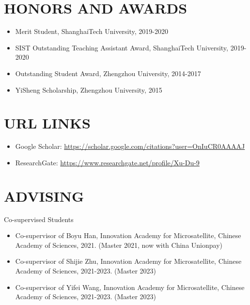 \documentclass[paper=a4,fontsize=11pt]{scrartcl} %
\newcommand{\sepspace}{\vspace*{1em}}		%
\newcommand{\NewPart}[1]{\section*{\uppercase{#1}}}
\newcommand{\EducationEntry}[4]{
		\noindent \textbf{#1} \hfill      %
		\colorbox{White}{%
			\parbox{5cm}{%
			\hfill\color{Black}#2}} \par  %
		\noindent \textit{#3} \par        %
		\noindent\hangindent=2em\hangafter=0 \small #4 %
		\normalsize \par}
\begin{document}
\NewPart{HONORS AND AWARDS}
\begin{itemize}
	\item Merit Student, ShanghaiTech University, 2019-2020
	
	\item SIST Outstanding Teaching Assistant Award, ShanghaiTech University, 2019-2020
		
	
	\item Outstanding Student Award, Zhengzhou University, 2014-2017
	
	\item YiSheng Scholarship, Zhengzhou University, 2015
	
	
	\end{itemize}
%
\NewPart{URL Links}
\begin{itemize}
	\item Google Scholar: \url{https://scholar.google.com/citations?user=OnIuCR0AAAAJ}
	\item ResearchGate: \url{https://www.researchgate.net/profile/Xu-Du-9}
\end{itemize}
\NewPart{Advising}{Co-supervised Students}
\begin{itemize}
	\item Co-supervisor of Boyu Han, Innovation Academy for Microsatellite, Chinese Academy of Sciences, 2021.
	(Master 2021, now with China Unionpay)
	\item Co-supervisor of Shijie Zhu, Innovation Academy for Microsatellite, Chinese Academy of Sciences, 2021-2023.
	(Master 2023)
	\item Co-supervisor of Yifei Wang, Innovation Academy for Microsatellite, Chinese Academy of Sciences, 2021-2023.
	(Master 2023)
\end{itemize}
\end{document}
